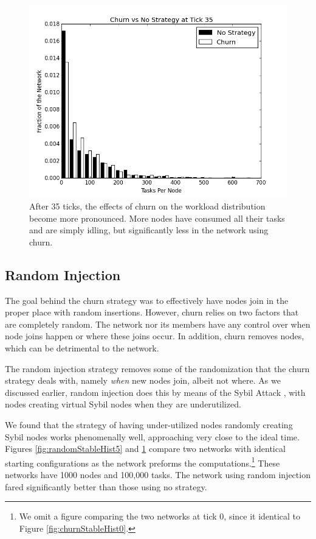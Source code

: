 \documentclass[11pt,conference]{IEEEtran}
\begin{document}
{	\begin{figure}
		\centering
		\includegraphics[width=0.7\linewidth]{figs/ChurnStableHist35}
		\caption[Workload for churn at tick 35]{After 35 ticks, the effects of churn on the workload distribution become more pronounced.  More nodes have consumed all their tasks and are simply idling, but significantly less in the network using churn.}
		\label{fig:churnStableHist35}
	\end{figure}
	
	\subsection{Random Injection}
	
	The goal behind the churn strategy was to effectively have nodes join in the proper place with random insertions.
	However, churn relies on two factors that are completely random.
	The network nor its members have any control over when node joins happen or where these joins occur.
	In addition, churn removes nodes, which can be detrimental to the network.
	
	The random injection strategy removes some of the randomization that the churn strategy deals with, namely \textit{when} new nodes join, albeit not where.
	As we discussed earlier, random injection does this by means of the Sybil Attack \cite{sybil}, with nodes creating virtual Sybil nodes when they are underutilized.
	
	We found that the strategy of having under-utilized nodes randomly creating Sybil nodes works phenomenally well, approaching very close to the ideal time.
	Figures \ref{fig:randomStableHist5} and \ref{fig:churnStableHist35} compare two networks with identical starting configurations as the network preforms the computations.\footnote{We omit a figure comparing the two networks at tick 0, since it identical to Figure \ref{fig:churnStableHist0}.}
	These networks have 1000 nodes and 100,000 tasks.  
	The network using random injection fared significantly better than those using no strategy.
	
}
\end{document}
